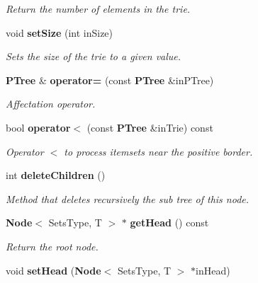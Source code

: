 \begin{CompactItemize}
\begin{CompactList}\small\item\em Return the number of elements in the trie. \item\end{CompactList}\item 
void {\bf set\-Size} (int in\-Size)\label{class_p_tree_95d13dd8e75352b21fbcfdb6cad4feb5}

\begin{CompactList}\small\item\em Sets the size of the trie to a given value. \item\end{CompactList}\item 
{\bf PTree} \& {\bf operator=} (const {\bf PTree} \&in\-PTree)
\begin{CompactList}\small\item\em Affectation operator. \item\end{CompactList}\item 
bool {\bf operator$<$} (const {\bf PTree} \&in\-Trie) const \label{class_p_tree_0bbb952dd9822a775e4454c3a1ef5bda}

\begin{CompactList}\small\item\em Operator $<$ to process itemsets near the positive border. \item\end{CompactList}\item 
int {\bf delete\-Children} ()\label{class_p_tree_009d68e1ac08d2d87697ffa1ae017984}

\begin{CompactList}\small\item\em Method that deletes recursively the sub tree of this node. \item\end{CompactList}\item 
{\bf Node}$<$ Sets\-Type, T $>$ $\ast$ {\bf get\-Head} () const \label{class_p_tree_ce39ce1f3afba5b22cb95e15ea3b8d6c}

\begin{CompactList}\small\item\em Return the root node. \item\end{CompactList}\item 
void {\bf set\-Head} ({\bf Node}$<$ Sets\-Type, T $>$ $\ast$in\-Head)\label{class_p_tree_380b31580b00ad7c093ceb3da0915582}


\end{CompactItemize}
